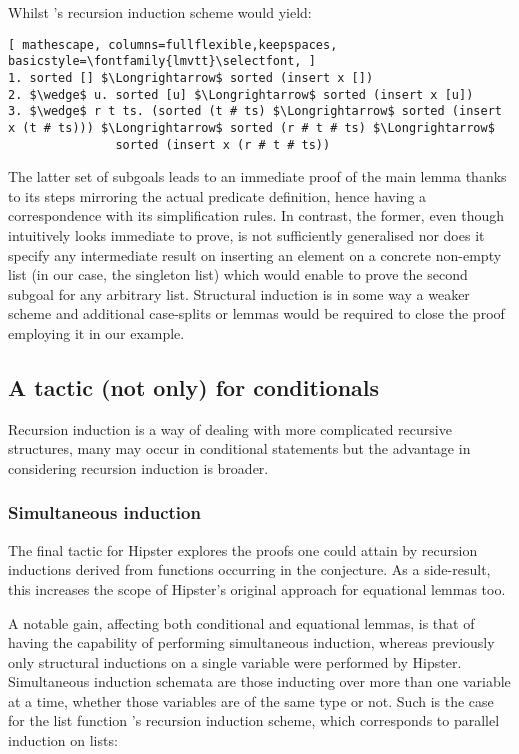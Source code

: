 \noindent Whilst 's recursion induction scheme would yield:

\begin{lstlisting}[ mathescape, columns=fullflexible,keepspaces, basicstyle=\fontfamily{lmvtt}\selectfont, ]
1. sorted [] $\Longrightarrow$ sorted (insert x [])
2. $\wedge$ u. sorted [u] $\Longrightarrow$ sorted (insert x [u])
3. $\wedge$ r t ts. (sorted (t # ts) $\Longrightarrow$ sorted (insert x (t # ts))) $\Longrightarrow$ sorted (r # t # ts) $\Longrightarrow$
               sorted (insert x (r # t # ts))
\end{lstlisting}

The latter set of subgoals leads to an immediate proof of the main lemma thanks to its steps mirroring the actual predicate definition, hence having a correspondence with its simplification rules.
%
In contrast, the former, even though intuitively looks immediate to prove, is not sufficiently generalised nor does it specify any intermediate result on inserting an element on a concrete non-empty list (in our case, the singleton list) which would enable to prove the second subgoal for any arbitrary list. Structural induction is in some way a weaker scheme and additional case-splits or lemmas would be required to close the proof employing it in our example.


\subsection{A tactic (not only) for conditionals}

Recursion induction is a way of dealing with more complicated recursive structures, many may occur in conditional statements but the advantage in considering recursion induction is broader.

\subsubsection*{Simultaneous induction}

The final tactic for Hipster explores the proofs one could attain by recursion inductions derived from functions occurring in the conjecture.
%
As a side-result, this increases the scope of Hipster's original approach for equational lemmas too.

A notable gain, affecting both conditional and equational lemmas, is that of having the capability of performing simultaneous induction, whereas previously only structural inductions on a single variable were performed by Hipster.
%
Simultaneous induction schemata are those inducting over more than one variable at a time, whether those variables are of the same type or not.
%
Such is the case for the list function 's recursion induction scheme, which corresponds to parallel induction on lists:

